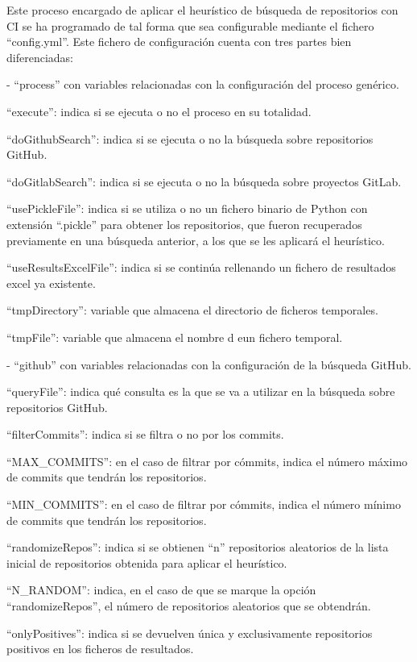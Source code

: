 Este proceso encargado de aplicar el heurístico de búsqueda de repositorios con CI se ha programado de tal forma que sea configurable mediante el fichero ``config.yml''. Este fichero de configuración cuenta con tres partes bien diferenciadas:

- ``process'' con variables relacionadas con la configuración del proceso genérico.
\begin{compactitem}
    \item ``execute'': indica si se ejecuta o no el proceso en su totalidad.
    \item ``doGithubSearch'': indica si se ejecuta o no la búsqueda sobre repositorios GitHub.
    \item ``doGitlabSearch'': indica si se ejecuta o no la búsqueda sobre proyectos GitLab.
    \item ``usePickleFile'': indica si se utiliza o no un fichero binario de Python con extensión ``.pickle'' para obtener los repositorios, que fueron recuperados previamente en una búsqueda anterior, a los que se les aplicará el heurístico.
    \item ``useResultsExcelFile'': indica si se continúa rellenando un fichero de resultados excel ya existente.
    \item ``tmpDirectory'': variable que almacena el directorio de ficheros temporales.
    \item ``tmpFile'': variable que almacena el nombre d eun fichero temporal.
\end{compactitem}
- ``github'' con variables relacionadas con la configuración de la búsqueda GitHub.
\begin{compactitem}
    \item ``queryFile'': indica qué consulta es la que se va a utilizar en la búsqueda sobre repositorios GitHub.
    \item ``filterCommits'': indica si se filtra o no por los commits.
    \item ``MAX\_COMMITS'': en el caso de filtrar por cómmits, indica el número máximo de commits que tendrán los repositorios.
    \item ``MIN\_COMMITS'': en el caso de filtrar por cómmits, indica el número mínimo de commits que tendrán los repositorios.
    \item ``randomizeRepos'': indica si se obtienen ``n'' repositorios aleatorios de la lista inicial de repositorios obtenida para aplicar el heurístico.
    \item ``N\_RANDOM'': indica, en el caso de que se marque la opción ``randomizeRepos'', el número de repositorios aleatorios que se obtendrán.
    \item ``onlyPositives'': indica si se devuelven única y exclusivamente repositorios positivos en los ficheros de resultados.
\end{compactitem}

